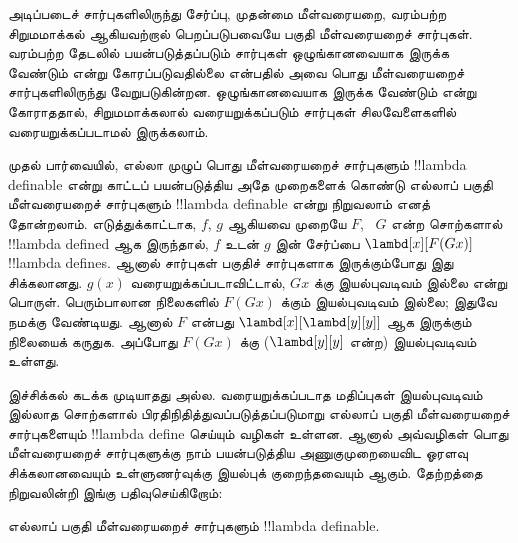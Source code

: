 \documentclass[../../../include/open-logic-section]{subfiles}
\begin{document}

அடிப்படைச் சார்புகளிலிருந்து சேர்ப்பு, முதன்மை மீள்வரையறை, வரம்பற்ற
சிறுமமாக்கல் ஆகியவற்றால் பெறப்படுபவையே பகுதி மீள்வரையறைச் சார்புகள்.
வரம்பற்ற தேடலில் பயன்படுத்தப்படும் சார்புகள் ஒழுங்கானவையாக இருக்க வேண்டும்
என்று கோரப்படுவதில்லை என்பதில் அவை பொது மீள்வரையறைச் சார்புகளிலிருந்து
வேறுபடுகின்றன. ஒழுங்கானவையாக இருக்க வேண்டும் என்று கோராததால்,
சிறுமமாக்கலால் வரையறுக்கப்படும் சார்புகள் சிலவேளைகளில்
வரையறுக்கப்படாமல் இருக்கலாம்.

முதல் பார்வையில், எல்லா முழுப் பொது மீள்வரையறைச் சார்புகளும்
!!{lambda definable} என்று காட்டப் பயன்படுத்திய அதே முறைகளைக் கொண்டு
எல்லாப் பகுதி மீள்வரையறைச் சார்புகளும் !!{lambda definable} என்று
நிறுவலாம் எனத் தோன்றலாம். எடுத்துக்காட்டாக, $f$, $g$ ஆகியவை முறையே $F$,
~$G$ என்ற சொற்களால் !!{lambda define}d ஆக இருந்தால், $f$ உடன் $g$ இன்
சேர்ப்பை $\lambd[x][F (G x)]$ !!{lambda define}s. ஆனால் சார்புகள்
பகுதிச் சார்புகளாக இருக்கும்போது இது சிக்கலானது. $g(x)$
வரையறுக்கப்படாவிட்டால், $G x$ க்கு இயல்புவடிவம் இல்லை என்று பொருள்.
பெரும்பாலான நிலைகளில் $F (G x)$ க்கும் இயல்புவடிவம் இல்லை; இதுவே நமக்கு
வேண்டியது. ஆனால் $F$ என்பது $\lambd[x][\lambd[y][y]]$ ஆக இருக்கும்
நிலையைக் கருதுக. அப்போது $F (G x)$ க்கு
($\lambd[y][y]$ என்ற) இயல்புவடிவம் உள்ளது.

இச்சிக்கல் கடக்க முடியாதது அல்ல. வரையறுக்கப்படாத மதிப்புகள் இயல்புவடிவம்
இல்லாத சொற்களால் பிரதிநிதித்துவப்படுத்தப்படுமாறு எல்லாப் பகுதி
மீள்வரையறைச் சார்புகளையும் !!{lambda define} செய்யும் வழிகள் உள்ளன.
ஆனால் அவ்வழிகள் பொது மீள்வரையறைச் சார்புகளுக்கு நாம் பயன்படுத்திய
அணுகுமுறையைவிட ஓரளவு சிக்கலானவையும் உள்ளுணர்வுக்கு இயல்புக் குறைந்தவையும்
ஆகும். தேற்றத்தை நிறுவலின்றி இங்கு பதிவுசெய்கிறோம்:

\begin{thm}
  எல்லாப் பகுதி மீள்வரையறைச் சார்புகளும் !!{lambda definable}.
\end{thm}
\end{document}
